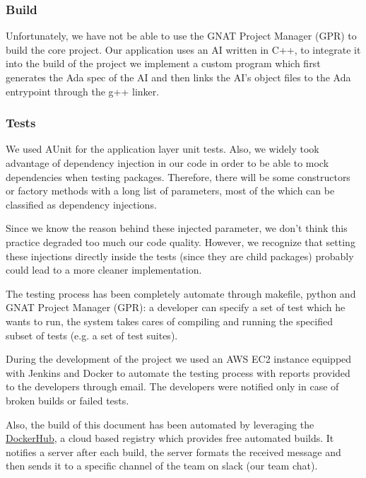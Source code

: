 \subsubsection{Build}
Unfortunately, we have not be able to use the GNAT Project Manager (GPR)
to build the core project. Our application uses an AI written in C++,
to integrate it into the build of the project we implement a custom program
which first generates the Ada spec of the AI and then
links the AI's object files to the Ada entrypoint through the g++ linker.

\subsubsection{Tests}
We used AUnit for the application layer unit tests.
Also, we widely took advantage of dependency injection in our code in order to
be able to mock dependencies when testing packages. Therefore, there will be
some constructors or factory methods with a long list of parameters, most of the
which can be classified as dependency injections.

Since we know
the reason behind these injected parameter,
we don't think this practice degraded too much our code quality.
However, we recognize that setting these
injections directly inside the tests (since they are child packages)
probably could lead to a more cleaner implementation.


The testing process has been completely automate through makefile, python and
GNAT Project Manager (GPR): a developer can specify a set of test which he wants
to run, the system takes cares of compiling and running the specified subset of
tests (e.g. a set of test suites).

During the development of the project we used an AWS EC2 instance
equipped with Jenkins and Docker to automate the testing process with
reports provided to the developers through email. The developers were notified
only in case of broken builds or failed tests.

Also, the build of this document has been automated by leveraging the
\href{https://hub.docker.com/}{DockerHub},
a cloud based registry which provides free automated builds.
It notifies a server after each build, the server formats the received message
and then sends it to a specific channel of the team on slack (our team chat).
